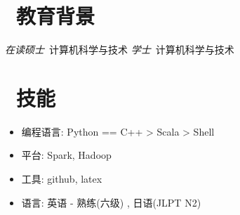 \documentclass{resume}
\begin{document}


 
\section{\faGraduationCap\  教育背景}
\textit{在读硕士}\ 计算机科学与技术
\textit{学士}\ 计算机科学与技术

\section{\faCogs\ 技能}
\begin{itemize}[parsep=0.5ex]
  \item 编程语言: Python == C++ > Scala > Shell
  \item 平台: Spark, Hadoop
  \item 工具: github, latex
  \item 语言: 英语 - 熟练(六级) , 日语(JLPT N2)

\end{itemize}
\end{document}
